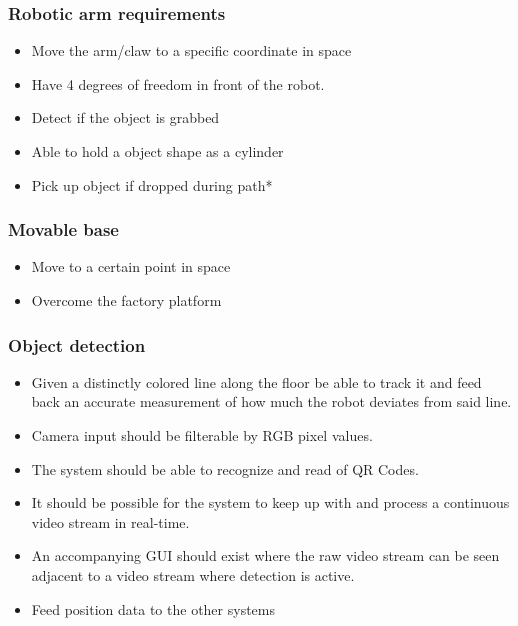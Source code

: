 \documentclass{beamer}
\begin{document}
\begin{frame}
    \frametitle{Robotic arm requirements}
    \begin{itemize}
        \item Move the arm/claw to a specific coordinate in space
        \item Have 4 degrees of freedom in front of the robot.
        \item Detect if the object is grabbed
        \item Able to hold a object shape as a cylinder
        \item Pick up object if dropped during path*
    \end{itemize}
\end{frame}

\begin{frame}
    \frametitle{Movable base}
    \begin{itemize}
        \item Move to a certain point in space
        \item Overcome the factory platform
    \end{itemize}
\end{frame}

\begin{frame}
    \frametitle{Object detection}
    \begin{itemize}
        \item Given a distinctly colored line along the floor be able to track it and
        feed back an accurate measurement of how much the robot deviates from said line.
        \item Camera input should be filterable by RGB pixel values.
        \item The system should be able to recognize and read of QR Codes.
        \item It should be possible for the system to keep up with and process a continuous video stream in real-time.
        \item An accompanying GUI should exist where the raw video stream can be seen adjacent to a video stream where detection is active.
        \item Feed position data to the other systems
    \end{itemize}
\end{frame}
\end{document}
